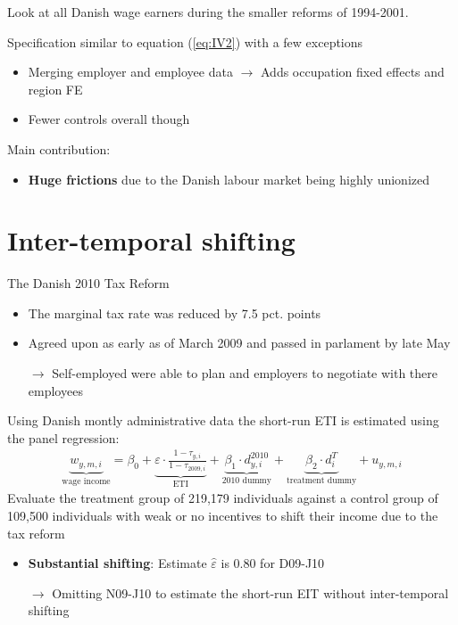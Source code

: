\documentclass[8pt]{beamer}
\begin{document}
\begin{frame}{\citet{chetty2011adjustment}}
  Look at all Danish wage earners during the smaller reforms of 1994-2001.

  Specification similar to equation (\ref{eq:IV2}) \citep{kleven2014estimating} with a few exceptions
  \begin{itemize}
    \item Merging employer and employee data $\rightarrow$ Adds occupation fixed effects and region FE
    \item Fewer controls overall though
  \end{itemize}
  Main contribution:
  \begin{itemize}
    \item \textbf{Huge frictions} due to the Danish labour market being highly unionized
  \end{itemize}
\end{frame}


\section{Inter-temporal shifting}


\begin{frame}{\citet{kreiner2016tax}}
  The Danish 2010 Tax Reform
  \begin{itemize}
    \item The marginal tax rate was reduced by 7.5 pct. points
    \item Agreed upon as early as  of March 2009 and passed in parlament by late May
    \item[$\rightarrow$] Self-employed were able to plan and employers to negotiate with there employees
  \end{itemize}
  Using Danish montly administrative data the short-run ETI is estimated using the panel regression: \begin{align}
    \underbrace{w_{y,m,i}}_\text{wage income} = \beta_0 + \underbrace{\varepsilon\cdot\frac{1-\tau_{y,i}}{1-\tau_{2009,i}}}_\text{ETI} + \underbrace{\beta_1\cdot d_{y,i}^{2010}}_\text{2010 dummy} + \underbrace{\beta_2\cdot d_i^T}_\text{treatment dummy} + u_{y,m,i}
    \label{eq:wage}
  \end{align}
  Evaluate the treatment group of 219,179 individuals against a control group of 109,500 individuals with weak or no incentives to shift their income due to the tax reform
  \begin{itemize}
    \item \textbf{Substantial shifting}: Estimate $\hat{\varepsilon}$ is 0.80 for D09-J10
    \item[$\rightarrow$] Omitting N09-J10 to estimate the short-run EIT without inter-temporal shifting
  \end{itemize}
\end{frame}
\end{document}
